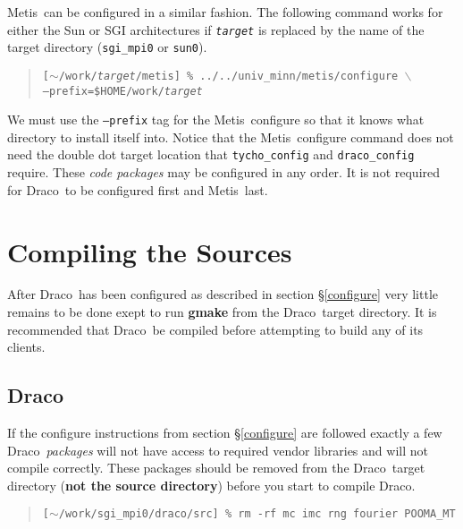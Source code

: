 \documentclass[10pt]{nmemo}
\newcommand{\comp}[1]{\normalfont\normalsize\texttt{#1}}
\newcommand{\draco}{{\normalfont\sffamily Draco}}
\newcommand{\metis}{{\normalfont\sffamily Metis}}
\begin{document}
\metis\ can be configured in a similar fashion.  The following command
works for either the Sun or SGI architectures if \comp{\emph{target}}
is replaced by the name of the target directory (\comp{sgi\_mpi0} or
\comp{sun0}).

\footnotesize
\begin{verse}
\texttt{[$\sim$/work/\emph{target}/metis] \%
../../univ\_minn/metis/configure $\backslash$\\
\hspace{0.5in}--prefix=\${HOME}/work/\emph{target}}
\end{verse}
\normalsize

We must use the \comp{--prefix} tag for the \metis\ configure so that
it knows what directory to install itself into.  Notice that the
\metis\ configure command does not need the double dot target location
that \comp{tycho\_config} and \comp{draco\_config} require.  These
\emph{code packages} may be configured in any order.  It is not
required for \draco\ to be configured first and \metis\ last.


\section{Compiling the Sources}
\label{compile}

After \draco\ has been configured as described in section
\S\ref{configure} very little remains to be done exept to run
\textbf{gmake} from the \draco\ target directory.  It is recommended
that \draco\ be compiled before attempting to build any of its
clients. 

\subsection{\draco}

If the configure instructions from section \S\ref{configure} are
followed exactly a few \draco\ \emph{packages} will not have access to
required vendor libraries and will not compile correctly.  These
packages should be removed from the \draco\ target directory
(\textbf{not the source directory}) before you start to compile
\draco.

\footnotesize
\begin{verse}
\texttt{[$\sim$/work/sgi\_mpi0/draco/src] \% rm -rf mc imc rng fourier POOMA\_MT}
\end{verse}
\normalsize
\end{document}
